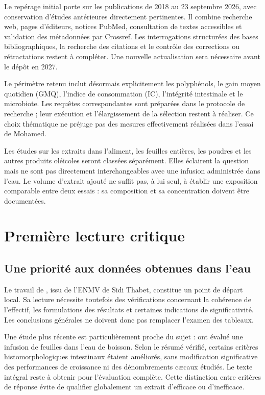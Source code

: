 \documentclass[11pt,a4paper]{article}
\begin{document}
Le repérage initial porte sur les publications de 2018 au 23 septembre 2026, avec conservation d'études antérieures directement pertinentes. Il combine recherche web, pages d'éditeurs, notices PubMed, consultation de textes accessibles et validation des métadonnées par Crossref. Les interrogations structurées des bases bibliographiques, la recherche des citations et le contrôle des corrections ou rétractations restent à compléter. Une nouvelle actualisation sera nécessaire avant le dépôt en 2027.

Le périmètre retenu inclut désormais explicitement les polyphénols, le gain moyen quotidien (GMQ), l'indice de consommation (IC), l'intégrité intestinale et le microbiote. Les requêtes correspondantes sont préparées dans le protocole de recherche ; leur exécution et l'élargissement de la sélection restent à réaliser. Ce choix thématique ne préjuge pas des mesures effectivement réalisées dans l'essai de Mohamed.

Les études sur les extraits dans l'aliment, les feuilles entières, les poudres et les autres produits oléicoles seront classées séparément. Elles éclairent la question mais ne sont pas directement interchangeables avec une infusion administrée dans l'eau. Le volume d'extrait ajouté ne suffit pas, à lui seul, à établir une exposition comparable entre deux essais : sa composition et sa concentration doivent être documentées.

\section{Première lecture critique}

\subsection{Une priorité aux données obtenues dans l'eau}

Le travail de \citet{Jabri2017}, issu de l'ENMV de Sidi Thabet, constitue un point de départ local. Sa lecture nécessite toutefois des vérifications concernant la cohérence de l'effectif, les formulations des résultats et certaines indications de significativité. Les conclusions générales ne doivent donc pas remplacer l'examen des tableaux.

Une étude plus récente est particulièrement proche du sujet : \citet{Erener2023} ont évalué une infusion de feuilles dans l'eau de boisson. Selon le résumé vérifié, certains critères histomorphologiques intestinaux étaient améliorés, sans modification significative des performances de croissance ni des dénombrements cæcaux étudiés. Le texte intégral reste à obtenir pour l'évaluation complète. Cette distinction entre critères de réponse évite de qualifier globalement un extrait d'efficace ou d'inefficace.
\end{document}
